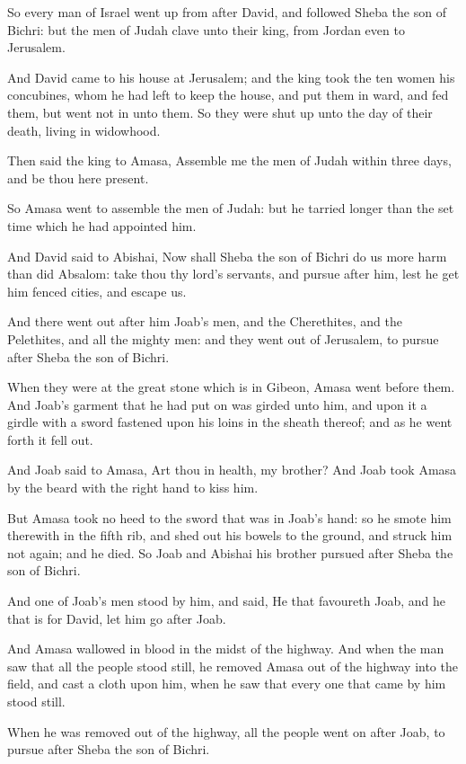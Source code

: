 \verse So every man of Israel went up from after David, and followed Sheba the son of Bichri: but the men of Judah clave unto their king, from Jordan even to Jerusalem.

\verse And David came to his house at Jerusalem; and the king took the ten women his concubines, whom he had left to keep the house, and put them in ward, and fed them, but went not in unto them. So they were shut up unto the day of their death, living in widowhood.

\verse Then said the king to Amasa, Assemble me the men of Judah within three days, and be thou here present.

\verse So Amasa went to assemble the men of Judah: but he tarried longer than the set time which he had appointed him.

\verse And David said to Abishai, Now shall Sheba the son of Bichri do us more harm than did Absalom: take thou thy lord's servants, and pursue after him, lest he get him fenced cities, and escape us.

\verse And there went out after him Joab's men, and the Cherethites, and the Pelethites, and all the mighty men: and they went out of Jerusalem, to pursue after Sheba the son of Bichri.

\verse When they were at the great stone which is in Gibeon, Amasa went before them. And Joab's garment that he had put on was girded unto him, and upon it a girdle with a sword fastened upon his loins in the sheath thereof; and as he went forth it fell out.

\verse And Joab said to Amasa, Art thou in health, my brother? And Joab took Amasa by the beard with the right hand to kiss him.

\verse But Amasa took no heed to the sword that was in Joab's hand: so he smote him therewith in the fifth rib, and shed out his bowels to the ground, and struck him not again; and he died. So Joab and Abishai his brother pursued after Sheba the son of Bichri.

\verse And one of Joab's men stood by him, and said, He that favoureth Joab, and he that is for David, let him go after Joab.

\verse And Amasa wallowed in blood in the midst of the highway. And when the man saw that all the people stood still, he removed Amasa out of the highway into the field, and cast a cloth upon him, when he saw that every one that came by him stood still.

\verse When he was removed out of the highway, all the people went on after Joab, to pursue after Sheba the son of Bichri.


